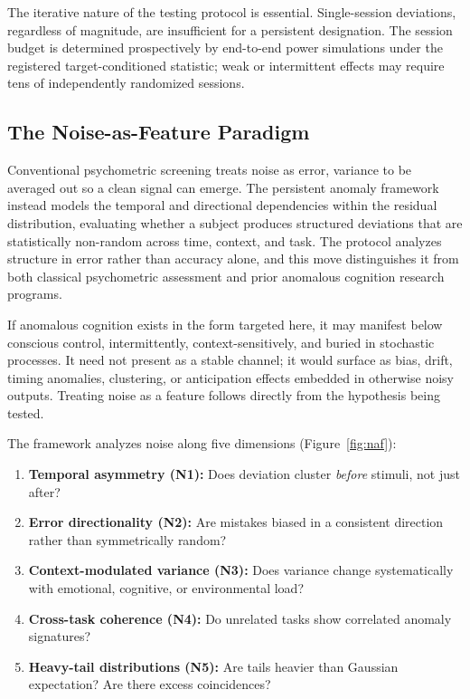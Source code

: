 \documentclass[11pt,letterpaper]{article}
\begin{document}
\medskip
The iterative nature of the testing protocol is essential. Single-session deviations, regardless of magnitude, are insufficient for a persistent designation. The session budget is determined prospectively by end-to-end power simulations under the registered target-conditioned statistic; weak or intermittent effects may require tens of independently randomized sessions.

\subsection{The Noise-as-Feature Paradigm}
\label{sec:naf}

Conventional psychometric screening treats noise as error, variance to be averaged out so a clean signal can emerge. The persistent anomaly framework instead models the temporal and directional dependencies within the residual distribution, evaluating whether a subject produces structured deviations that are statistically non-random across time, context, and task. The protocol analyzes structure in error rather than accuracy alone, and this move distinguishes it from both classical psychometric assessment and prior anomalous cognition research programs.

If anomalous cognition exists in the form targeted here, it may manifest below conscious control, intermittently, context-sensitively, and buried in stochastic processes. It need not present as a stable channel; it would surface as bias, drift, timing anomalies, clustering, or anticipation effects embedded in otherwise noisy outputs. Treating noise as a feature follows directly from the hypothesis being tested.

The framework analyzes noise along five dimensions (Figure~\ref{fig:naf}):

\begin{enumerate}[nosep]
    \item \textbf{Temporal asymmetry (N1):} Does deviation cluster \textit{before} stimuli, not just after?
    \item \textbf{Error directionality (N2):} Are mistakes biased in a consistent direction rather than symmetrically random?
    \item \textbf{Context-modulated variance (N3):} Does variance change systematically with emotional, cognitive, or environmental load?
    \item \textbf{Cross-task coherence (N4):} Do unrelated tasks show correlated anomaly signatures?
    \item \textbf{Heavy-tail distributions (N5):} Are tails heavier than Gaussian expectation? Are there excess coincidences?
\end{enumerate}
\end{document}
